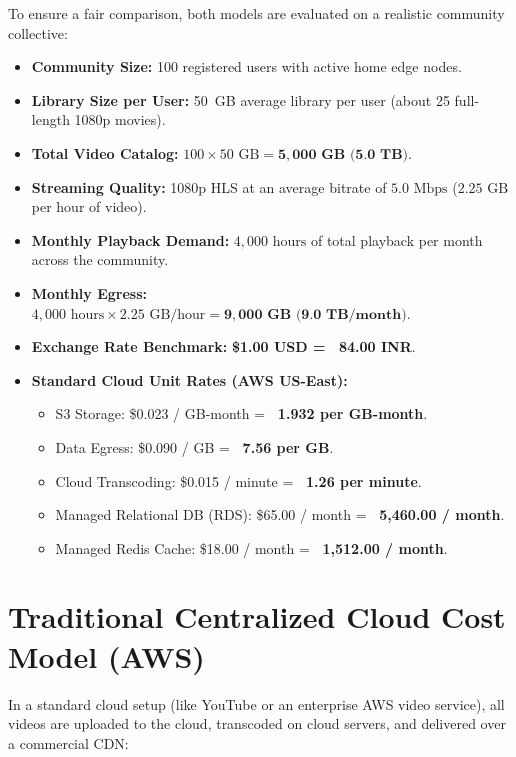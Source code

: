 To ensure a fair comparison, both models are evaluated on a realistic community collective:
\begin{itemize}
    \item \textbf{Community Size:} 100 registered users with active home edge nodes.
    \item \textbf{Library Size per User:} 50~GB average library per user (about 25 full-length 1080p movies).
    \item \textbf{Total Video Catalog:} $100 \times 50\text{ GB} = \mathbf{5{,}000\text{ GB (5.0 TB)}}$.
    \item \textbf{Streaming Quality:} 1080p HLS at an average bitrate of $5.0\text{ Mbps}$ ($2.25\text{ GB}$ per hour of video).
    \item \textbf{Monthly Playback Demand:} $4{,}000\text{ hours}$ of total playback per month across the community.
    \item \textbf{Monthly Egress:} $4{,}000\text{ hours} \times 2.25\text{ GB/hour} = \mathbf{9{,}000\text{ GB (9.0 TB/month)}}$.
    \item \textbf{Exchange Rate Benchmark:} \textbf{\$1.00 USD = \rupee~84.00 INR}.
    \item \textbf{Standard Cloud Unit Rates (AWS US-East):}
    \begin{itemize}
        \item S3 Storage: \$0.023 / GB-month = \textbf{\rupee~1.932 per GB-month}.
        \item Data Egress: \$0.090 / GB = \textbf{\rupee~7.56 per GB}.
        \item Cloud Transcoding: \$0.015 / minute = \textbf{\rupee~1.26 per minute}.
        \item Managed Relational DB (RDS): \$65.00 / month = \textbf{\rupee~5,460.00 / month}.
        \item Managed Redis Cache: \$18.00 / month = \textbf{\rupee~1,512.00 / month}.
    \end{itemize}
\end{itemize}

\section{Traditional Centralized Cloud Cost Model (AWS)}
\label{sec:cost_traditional}

In a standard cloud setup (like YouTube or an enterprise AWS video service), all videos are uploaded to the cloud, transcoded on cloud servers, and delivered over a commercial CDN:

